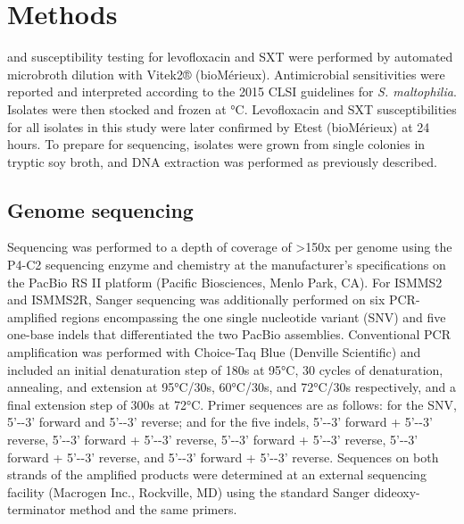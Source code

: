 \section{Methods}

 and susceptibility testing for levofloxacin and SXT were performed by automated microbroth dilution with Vitek2® (bioMérieux). Antimicrobial sensitivities were reported and interpreted according to the 2015 CLSI guidelines for \emph{S. maltophilia}.\autocite{ClinicalandLaboratoryStandardsInstitute2015} Isolates were then stocked and frozen at °C. Levofloxacin and SXT susceptibilities for all isolates in this study were later confirmed by Etest (bioMérieux) at 24 hours. To prepare for sequencing, isolates were grown from single colonies in tryptic soy broth, and DNA extraction was performed as previously described.\autocite{Altman2014}

\subsection{Genome sequencing}

Sequencing was performed to a depth of coverage of >150x per genome using the P4-C2 sequencing enzyme and chemistry at the manufacturer’s specifications on the PacBio RS II platform (Pacific Biosciences, Menlo Park, CA). For ISMMS2 and ISMMS2R, Sanger sequencing was additionally performed on six PCR-amplified regions encompassing the one single nucleotide variant (SNV) and five one-base indels that differentiated the two PacBio assemblies. Conventional PCR amplification was performed with Choice-Taq Blue (Denville Scientific) and included an initial denaturation step of 180s at 95°C, 30 cycles of denaturation, annealing, and extension at 95°C/30s, 60°C/30s, and 72°C/30s respectively, and a final extension step of 300s at 72°C. Primer sequences are as follows: for the SNV, 5’-\texttt{}-3’ forward and 5’-\texttt{}-3’ reverse; and for the five indels, 5’-\texttt{}-3’ forward + 5’-\texttt{}-3’ reverse, 5’-\texttt{}-3’ forward + 5’-\texttt{}-3’ reverse, 5’-\texttt{}-3’ forward + 5’-\texttt{}-3’ reverse, 5’-\texttt{}-3’ forward + 5’-\texttt{}-3’ reverse, and 5’-\texttt{}-3’ forward + 5’-\texttt{}-3’ reverse. Sequences on both strands of the amplified products were determined at an external sequencing facility (Macrogen Inc., Rockville, MD) using the standard Sanger dideoxy-terminator method and the same primers.

